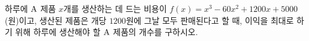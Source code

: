 하루에 $\mathrm{A}$ 제품 $x$개를 생산하는 데 드는 비용이 $f(x)=x^3-60x^2+1200x+5000$(원)이고, 생산된 제품은 개당 $1200$원에 그날 모두 판매된다고 할 때, 이익을 최대로 하기 위해 하루에 생산해야 할 $\mathrm{A}$ 제품의 개수를 구하시오.
